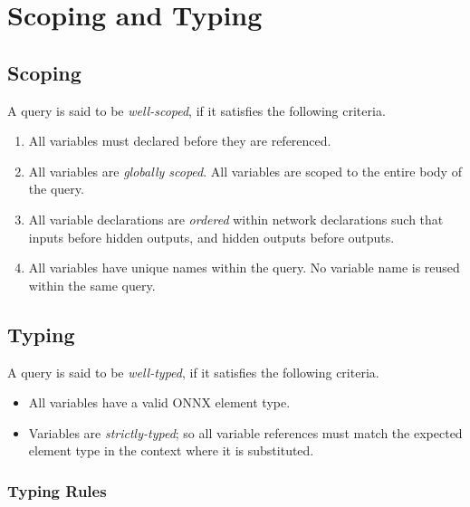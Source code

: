 \section{Scoping and Typing}
\label{sec:scoping_and_typing}

\subsection{Scoping}
A \vnnlib{} query is said to be \textit{well-scoped}, if it satisfies the following criteria.
\begin{enumerate}
    \item All variables must declared before they are referenced.
    \item All variables are \textit{globally scoped}. All variables are scoped to the entire body of the query.
    \item All variable declarations are \textit{ordered} within network declarations such that inputs before hidden outputs, and hidden outputs before outputs.
    \item All variables have unique names within the query. No variable name is reused within the same query.
\end{enumerate}

\subsection{Typing}
A \vnnlib{} query is said to be \textit{well-typed}, if it satisfies the following criteria.

\begin{itemize}
    \item All variables have a valid ONNX element type.
    \item Variables are \textit{strictly-typed}; so all variable references must match the expected element type in the context where it is substituted.
\end{itemize}

\subsubsection*{Typing Rules}

